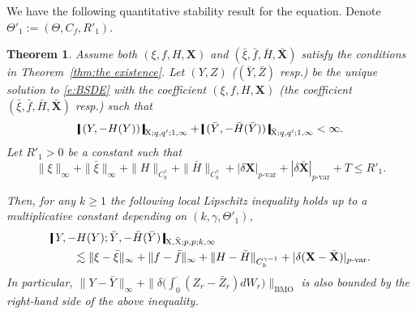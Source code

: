 \documentclass[11pt,reqno]{amsart}
\newtheorem{theorem}[lemma]{Theorem}
\numberwithin{equation}{section}
\newcommand{\shortthickbar}{%
  \vcenter{\hbox{\rule{1.8pt}{2.2ex}}}%
}
\newcommand{\thicknm}[1]{%
  \mathopen{\shortthickbar}%
  \mkern4mu #1 \mkern4mu%
  \mathclose{\shortthickbar}%
}
\begin{document}
We have the following quantitative stability result for the equation. Denote $\Theta'_1 := (\Theta,C_f, R'_1)$. 

\begin{theorem}\label{thm:stability}
Assume both $(\xi,f,H,\mathbf X)$ and $(\bar \xi, \bar f, \bar H, \bar{\mathbf X})$ satisfy the conditions in Theorem~\ref{thm:the existence}. Let $(Y,Z)$ ($(\bar Y,\bar Z)$ resp.) be the unique solution to \eqref{e:BSDE} with the coefficient $(\xi,f,H,\mathbf X)$ (the coefficient $(\bar \xi,\bar f, \bar H, \bar{\mathbf X})$ resp.) such that  
\begin{equation*}
\thicknm{(Y,-H(Y))}_{\mathrm X;q,q';1,\infty}  + \thicknm{(\bar Y,- \bar H(\bar Y))}_{\bar{\mathrm X};q,q';1,\infty} < \infty.
\end{equation*}
Let $R'_1 > 0$ be a constant such that 
\begin{equation*}
\|\xi\|_{\infty} + \|\bar \xi\|_{\infty} + \|H\|_{C^{\gamma}_b} + \|\bar H\|_{C^{\gamma}_b} + |\delta \mathbf X |_{p\text{-}\mathrm{var}} + |\delta  \bar{\mathbf X} |_{p\text{-}\mathrm{var}} + T \le R'_1.
\end{equation*}


Then, for any $k \ge 1$ the following local Lipschitz inequality holds up to a multiplicative constant depending on $(k,\gamma,\Theta'_1)$,
\begin{equation}
\begin{aligned}\label{ine:stab}
&\thicknm{Y,-H(Y) ; \bar Y, - \bar H(\bar Y)}_{\mathrm X,\bar{\mathrm X};p,p;k,\infty}     \\ 
& \qquad \lesssim \|\xi - \bar \xi\|_{\infty} + \|f - \bar f\|_{\infty} + \|H - \bar H\|_{C^{\gamma - 1}_b} + |\delta (\mathbf X - \bar{\mathbf X}) |_{p\text{-}\mathrm{var}} . 
\end{aligned}
\end{equation}
In particular, $\|Y - \bar Y\|_{\infty} + \|\delta \big( \int_0 ^{\bm\cdot} (Z_r - \bar Z_r) dW_r \big)\|_{\mathrm{BMO}}$ is also bounded by the right-hand side of the above inequality.
\end{theorem}
\end{document}
